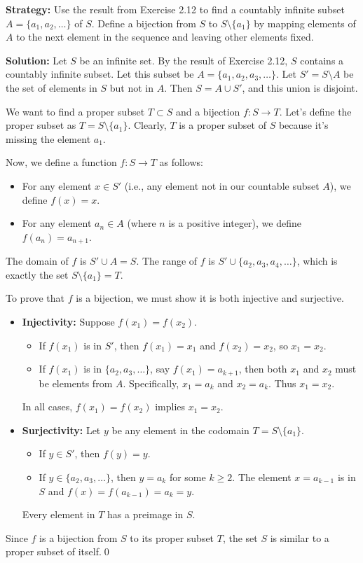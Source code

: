 \noindent\textbf{Strategy:} Use the result from Exercise 2.12 to find a countably infinite subset $A = \{a_1, a_2, \ldots\}$ of $S$. Define a bijection from $S$ to $S \setminus \{a_1\}$ by mapping elements of $A$ to the next element in the sequence and leaving other elements fixed.

\bigskip\noindent\textbf{Solution:}  
Let $S$ be an infinite set. By the result of Exercise 2.12, $S$ contains a countably infinite subset. Let this subset be $A = \{a_1, a_2, a_3, \dots \}$.
Let $S' = S \setminus A$ be the set of elements in $S$ but not in $A$. Then $S = A \cup S'$, and this union is disjoint.

We want to find a proper subset $T \subset S$ and a bijection $f: S \to T$.
Let's define the proper subset as $T = S \setminus \{a_1\}$. Clearly, $T$ is a proper subset of $S$ because it's missing the element $a_1$.

Now, we define a function $f: S \to T$ as follows:
\begin{itemize}
\item For any element $x \in S'$ (i.e., any element not in our countable subset $A$), we define $f(x) = x$.
\item For any element $a_n \in A$ (where $n$ is a positive integer), we define $f(a_n) = a_{n+1}$.
\end{itemize}
The domain of $f$ is $S' \cup A = S$. The range of $f$ is $S' \cup \{a_2, a_3, a_4, \dots\}$, which is exactly the set $S \setminus \{a_1\} = T$.

To prove that $f$ is a bijection, we must show it is both injective and surjective.
\begin{itemize}
\item \textbf{Injectivity:} Suppose $f(x_1) = f(x_2)$.
\begin{itemize}
\item If $f(x_1)$ is in $S'$, then $f(x_1)=x_1$ and $f(x_2)=x_2$, so $x_1=x_2$.
\item If $f(x_1)$ is in $\{a_2, a_3, \dots\}$, say $f(x_1) = a_{k+1}$, then both $x_1$ and $x_2$ must be elements from $A$. Specifically, $x_1 = a_k$ and $x_2 = a_k$. Thus $x_1=x_2$.
\end{itemize}
In all cases, $f(x_1)=f(x_2)$ implies $x_1=x_2$.
\item \textbf{Surjectivity:} Let $y$ be any element in the codomain $T = S \setminus \{a_1\}$.
\begin{itemize}
\item If $y \in S'$, then $f(y) = y$.
\item If $y \in \{a_2, a_3, \dots\}$, then $y=a_k$ for some $k \geq 2$. The element $x=a_{k-1}$ is in $S$ and $f(x) = f(a_{k-1}) = a_k = y$.
\end{itemize}
Every element in $T$ has a preimage in $S$.
\end{itemize}
Since $f$ is a bijection from $S$ to its proper subset $T$, the set $S$ is similar to a proper subset of itself.\qed




